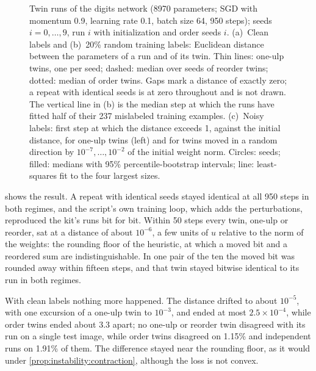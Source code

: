 \begin{refsection}
\begin{figure}[t]
\begin{fullwidth}
\begin{tikzpicture}
\end{tikzpicture}
\caption{Twin runs of the digits network (8970 parameters; SGD with momentum 0.9, learning rate 0.1, batch size 64, 950 steps); seeds $i=0,\dots,9$, run $i$ with initialization and order seeds $i$. (a)~Clean labels and (b)~20\% random training labels: Euclidean distance between the parameters of a run and of its twin. Thin lines: one-ulp twins, one per seed; dashed: median over seeds of reorder twins; dotted: median of order twins. Gaps mark a distance of exactly zero; a repeat with identical seeds is at zero throughout and is not drawn. The vertical line in (b) is the median step at which the runs have fitted half of their 237 mislabeled training examples. (c)~Noisy labels: first step at which the distance exceeds 1, against the initial distance, for one-ulp twins (left) and for twins moved in a random direction by $10^{-7},\dots,10^{-2}$ of the initial weight norm. Circles: seeds; filled: medians with 95\% percentile-bootstrap intervals; line: least-squares fit to the four largest sizes.}
\label{fig:instability:twins}
\end{fullwidth}
\end{figure}

 shows the result. A repeat with identical seeds stayed identical at all 950 steps in both regimes, and the script's own training loop, which adds the perturbations, reproduced the kit's runs bit for bit. Within 50 steps every twin, one-ulp or reorder, sat at a distance of about $10^{-6}$, a few units of $u$ relative to the norm of the weights: the rounding floor of the heuristic, at which a moved bit and a reordered sum are indistinguishable. In one pair of the ten the moved bit was rounded away within fifteen steps, and that twin stayed bitwise identical to its run in both regimes.

With clean labels nothing more happened. The distance drifted to about $10^{-5}$, with one excursion of a one-ulp twin to $10^{-3}$, and ended at most $2.5\times10^{-4}$, while order twins ended about 3.3 apart; no one-ulp or reorder twin disagreed with its run on a single test image, while order twins disagreed on 1.15\% and independent runs on 1.91\% of them. The difference stayed near the rounding floor, as it would under \cref{prop:instability:contraction}, although the loss is not convex.


\end{refsection}

